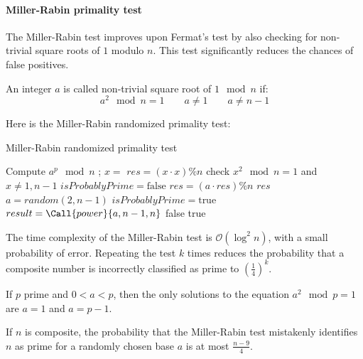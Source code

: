 \paragraph*{Miller-Rabin primality test}
The Miller-Rabin test improves upon Fermat's test by also checking for non-trivial square roots of $1$ modulo $n$. 
This test significantly reduces the chances of false positives.
\begin{definition}
    An integer $a$ is called non-trivial square root of $1 \mod n$ if: 
    \[a^2 \mod n = 1 \qquad a \neq 1 \qquad a \neq n - 1\]
\end{definition}
Here is the Miller-Rabin randomized primality test:
\begin{algorithm}[H]
    \caption{Miller-Rabin randomized primality test}
    \begin{algorithmic}[1]
             \Comment Compute $a^p \mod n$
                \State {}; 
            \EndIf 
            \State $x=$ 
            \State $res= (x \cdot x) \% n$
             \Comment check $x^2 \mod n = 1$ and $x \neq 1, n-1$
                \State $isProbablyPrime=\text{false}$
            \EndIf
                \State $res=(a\cdot res)\%n$
            \EndIf
            \State \Return $res$
        \EndFunction
        \Statex 
            \State $a = random(2, n-1)$
            \State $isProbablyPrime = \text{true}$
            \State $result = \Call{power}{a, n-1, n}$
                \State \Return false
            \Else
                \State \Return true
            \EndIf
        \EndFunction
    \end{algorithmic}
\end{algorithm}
The time complexity of the Miller-Rabin test is $\mathcal{O}(\log^2n)$, with a small probability of error.
Repeating the test $k$ times reduces the probability that a composite number is incorrectly classified as prime to $\left(\frac{1}{4}\right)^k$. 
\begin{theorem}
    If $p$ prime and $0 < a < p$, then the only solutions to the equation $a^2 \mod p = 1$ are $a = 1$ and $a = p - 1$.
\end{theorem}
\begin{theorem}
    If $n$ is composite, the probability that the Miller-Rabin test mistakenly identifies $n$ as prime for a randomly chosen base $a$ is at most $\frac{n-9}{4}$.
\end{theorem}

